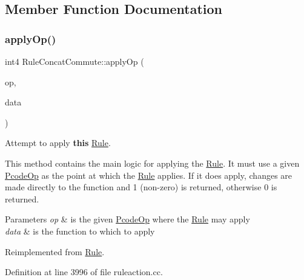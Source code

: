 \subsection{Member Function Documentation}
\mbox{\label{class_rule_concat_commute_a75dbdeccddc5baf27b6390449b331bcf}} 
\subsubsection{\texorpdfstring{applyOp()}{applyOp()}}
{\footnotesize\ttfamily int4 Rule\+Concat\+Commute\+::apply\+Op (\begin{DoxyParamCaption}\item[{\mbox{\hyperlink{class_pcode_op}{Pcode\+Op}} $\ast$}]{op,  }\item[{\mbox{\hyperlink{class_funcdata}{Funcdata}} \&}]{data }\end{DoxyParamCaption})\hspace{0.3cm}{\ttfamily [virtual]}}



Attempt to apply {\bfseries{this}} \mbox{\hyperlink{class_rule}{Rule}}. 

This method contains the main logic for applying the \mbox{\hyperlink{class_rule}{Rule}}. It must use a given \mbox{\hyperlink{class_pcode_op}{Pcode\+Op}} as the point at which the \mbox{\hyperlink{class_rule}{Rule}} applies. If it does apply, changes are made directly to the function and 1 (non-\/zero) is returned, otherwise 0 is returned. 
\begin{DoxyParams}{Parameters}
{\em op} & is the given \mbox{\hyperlink{class_pcode_op}{Pcode\+Op}} where the \mbox{\hyperlink{class_rule}{Rule}} may apply \\
\hline
{\em data} & is the function to which to apply \\
\hline
\end{DoxyParams}


Reimplemented from \mbox{\hyperlink{class_rule_a4e3e61f066670175009f60fb9dc60848}{Rule}}.



Definition at line 3996 of file ruleaction.\+cc.


